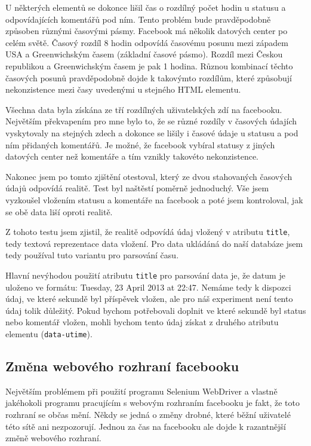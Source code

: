 \documentclass[thesis=M,czech]{FITthesis}[2013/05/10]
\begin{document}
U některých elementů se dokonce lišil čas o rozdílný počet hodin u statusu a odpovídajících komentářů pod ním. Tento problém bude pravděpodobně způsoben různými časovými pásmy. Facebook má několik datových center po  celém světě. Časový rozdíl 8 hodin odpovídá časovému posunu mezi západem USA a Greenwichským časem (základní časové pásmo). Rozdíl mezi Českou republikou a Greenwichským časem je pak 1 hodina. Různou kombinací těchto časových posunů pravděpodobně dojde k takovýmto rozdílům, které způsobují nekonzistence mezi časy uvedenými u stejného HTML elementu. 

Všechna data byla získána ze tří rozdílných uživatelských zdí na facebooku. Největším překvapením pro mne bylo to, že se různé rozdíly v časových údajích vyskytovaly na stejných zdech a dokonce se lišily i časové údaje u statusu a pod ním přidaných komentářů.  Je možné, že facebook vybíral statusy z jiných datových center než komentáře a tím vznikly takovéto nekonzistence.

Nakonec jsem po tomto zjištění otestoval, který ze dvou stahovaných časových údajů odpovídá realitě. Test byl naštěstí poměrně jednoduchý. Vše jsem vyzkoušel vložením statusu a komentáře na facebook a poté jsem kontroloval, jak se obě data liší oproti realitě. 

Z tohoto testu jsem zjistil, že realitě odpovídá údaj vložený v atributu \verb|title|, tedy textová reprezentace data vložení. Pro data ukládáná do naší databáze jsem tedy používal tuto variantu pro parsování času.

Hlavní nevýhodou použití atributu \verb|title| pro parsování data je, že datum je uloženo ve formátu: Tuesday, 23 April 2013 at 22:47. Nemáme tedy k dispozci údaj, ve které sekundě byl příspěvek vložen, ale pro náš experiment není tento údaj tolik důležitý. Pokud bychom potřebovali doplnit ve které sekundě byl status nebo komentář vložen, mohli bychom tento údaj získat z druhého atributu elementu (\verb|data-utime|). 

\subsection{Změna webového rozhraní facebooku}

Největším problémem při použití programu Selenium WebDriver a vlastně jakéhokoli programu pracujícím s webovým rozhraním facebooku je fakt, že toto rozhraní se občas mění. Někdy se jedná o změny drobné, které běžní uživatelé této sítě ani nezpozorují. Jednou za čas na facebooku ale dojde k razantnější změně webového rozhraní.
\end{document}

